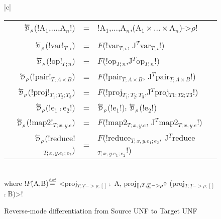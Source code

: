 \begin{figure*}[t]
\begin{tabular}{|c|}
\hline
    \begin{tabular}{r c l}
    $\Dsynrevsymbol_{\rho}$(!A$_1$,$\ldots$,A$_n$!) &=& !A$_1$,$\ldots$,A$_n$,(A$_1\times\ldots\times$A$_n$)->$\rho$!\\ \\
    $\Dsynrevsymbol_{\rho}$(!var!$_{T;i}$) &=& $F$(!var$_{T;i}$, J$^T$var$_{T;i}$!) \\
    $\Dsynrevsymbol_{\rho}$(!op!$_{\Gamma;n}$) &=& $F$(!op$_{T;n}$,J$^T$op$_{T;n}$!) \\ 
    $\Dsynrevsymbol_{\rho}$(!pair!$_{T;A\times B}$) &=& $F$(!pair$_{T;A\times B}$, J$^T$pair$_{T;A\times B}$!) \\
    $\Dsynrevsymbol_{\rho}$(!proj!$_{T_1;T_2;T_3}$) &=& $F$(!proj$_{T_1;T_2;T_3}$,J$^T$proj$_{T1;T2;T3}$!) \\
    $\Dsynrevsymbol_{\rho}$(!e$_1\comp$e$_2$!) &=& $\Dsynrevsymbol_{\rho}$(!e$_1$!)$\comp$ $\Dsynrevsymbol_{\rho}$(!e$_2$!)\\ 
    $\Dsynrevsymbol_{\rho}$(!map2!$_{T;x,y.e}$) &=& $F$(!map2$_{T;x,y.e}$, J$^T$map2$_{T;x,y.e}$!) \\
    $\Dsynrevsymbol_{\rho}$(!reduce!$_{T;x,y.e_1;e_2}$) &=& $F$(!reduce$_{T;x,y.e_1;e_2}$, J$^T$reduce$_{T;x,y.e_1;e_2}$!) \\
    \end{tabular}\\
    where !$F$(A,B)$\stackrel {\mathrm{def}}=$ <proj$_{T;\underline{T}->\rho;[]} \comp$ A, proj$_{[];T;\underline{T}->\rho} \circ$ (proj$_{T;\underline{T}->\rho;[]}$ $\comp$ B)>!\\\hline
    \end{tabular}
    \caption{Reverse-mode differentiation from Source UNF to Target UNF}
    \label{fig:diff_macro}    
\end{figure*}